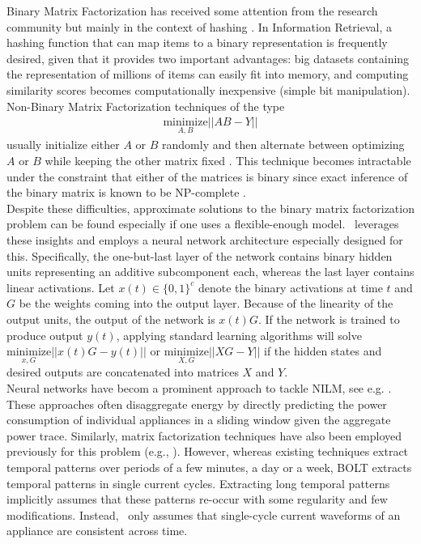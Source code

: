 Binary Matrix Factorization has received some attention from the research community but mainly in the context of hashing \cite{carreira2015hashing}. In Information Retrieval, a hashing function that can map items to a binary representation is frequently desired, given that it provides two important advantages: big datasets containing the representation of millions of items can easily fit into memory, and computing similarity scores becomes computationally inexpensive (simple bit manipulation).\\
Non-Binary Matrix Factorization techniques of the type
\begin{align*}
\underset{A,B}{\text{minimize}} ||AB - Y||
\end{align*}
 usually initialize either $A$ or $B$ randomly and then alternate between optimizing $A$ or $B$ while keeping the other matrix fixed \cite{sparse}. This technique becomes intractable under the constraint that either of the matrices is binary since exact inference of the binary matrix is known to be NP-complete \cite{carreira2015hashing}.\\
Despite these difficulties, approximate solutions to the binary matrix factorization problem can be found especially if one uses a flexible-enough model. \ourname~leverages these insights and employs a neural network architecture especially designed for this. Specifically, the one-but-last layer of the network contains binary hidden units representing an additive subcomponent each, whereas the last layer contains linear activations. Let $x(t) \in \{0,1\}^c$ denote the binary activations at time $t$ and $G$ be the weights coming into the output layer. Because of the linearity of the output units, the output of the network is $x(t)G$. If the network is trained to produce output $y(t)$, applying standard learning algorithms will solve $\underset{x,G}{\text{minimize}} ||x(t)G - y(t)||$ or $\underset{X,G}{\text{minimize}} ||XG - Y||$ if the hidden states and desired outputs are concatenated into matrices $X$ and $Y$.\\
Neural networks have becom a prominent approach to tackle NILM, see e.g. \cite{kelly2015neural,zhang2018sequence,barsim2018neural,salerno2018extreme}. These approaches often disaggregate energy by directly predicting the power consumption of individual appliances in a sliding window given the aggregate power trace. Similarly, matrix factorization techniques have also been employed previously for this problem (e.g., \cite{sparse,matsumoto2016energy}). However, whereas existing techniques extract temporal patterns over periods of a few minutes, a day or a week, BOLT extracts temporal patterns in single current cycles. Extracting long temporal patterns implicitly assumes that these patterns re-occur with some regularity and few modifications. Instead, \ourname~only assumes that single-cycle current waveforms of an appliance are consistent across time.\\
